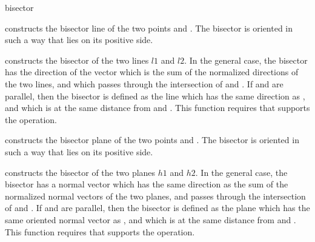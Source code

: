 \begin{ccRefFunction}{bisector}

{constructs the bisector line of the two points  and .
The bisector is oriented in such a way that  lies on its
positive side. }

{constructs the bisector of the two lines $l1$ and $l2$.
In the general case, the bisector has the direction of the vector which
is the sum of the normalized directions of the two lines, and which passes
through the intersection of  and .
If  and  are parallel, then the bisector is defined as the line
which has the same direction as , and which is at the same distance
from  and .
This function requires that  supports the 
operation.}

{constructs the bisector plane of the two points  and .
The bisector is oriented in such a way that  lies on its
positive side. }

{constructs the bisector of the two planes $h1$ and $h2$.
In the general case, the bisector has a normal vector which has the same
direction as the sum of the normalized normal vectors of the two planes, and
passes through the intersection of  and .
If  and  are parallel, then the bisector is defined as the
plane which has the same oriented normal vector as , and which is at
the same distance from  and .
This function requires that  supports the 
operation.}

\end{ccRefFunction}
